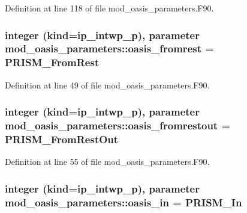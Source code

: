 Definition at line 118 of file mod\+\_\+oasis\+\_\+parameters.\+F90.

\hypertarget{classmod__oasis__parameters_aa0584909970d34364b7ec319292b1682}{
\subsubsection[{oasis\+\_\+fromrest}]{\setlength{\rightskip}{0pt plus 5cm}integer (kind=ip\+\_\+intwp\+\_\+p), parameter mod\+\_\+oasis\+\_\+parameters\+::oasis\+\_\+fromrest = P\+R\+I\+S\+M\+\_\+\+From\+Rest}}\label{classmod__oasis__parameters_aa0584909970d34364b7ec319292b1682}


Definition at line 49 of file mod\+\_\+oasis\+\_\+parameters.\+F90.

\hypertarget{classmod__oasis__parameters_a76a87a170e0c08863ae981693eb88fb8}{
\subsubsection[{oasis\+\_\+fromrestout}]{\setlength{\rightskip}{0pt plus 5cm}integer (kind=ip\+\_\+intwp\+\_\+p), parameter mod\+\_\+oasis\+\_\+parameters\+::oasis\+\_\+fromrestout = P\+R\+I\+S\+M\+\_\+\+From\+Rest\+Out}}\label{classmod__oasis__parameters_a76a87a170e0c08863ae981693eb88fb8}


Definition at line 55 of file mod\+\_\+oasis\+\_\+parameters.\+F90.

\hypertarget{classmod__oasis__parameters_a16809ad581bb609aa5b0661927478653}{
\subsubsection[{oasis\+\_\+in}]{\setlength{\rightskip}{0pt plus 5cm}integer (kind=ip\+\_\+intwp\+\_\+p), parameter mod\+\_\+oasis\+\_\+parameters\+::oasis\+\_\+in = P\+R\+I\+S\+M\+\_\+\+In}}\label{classmod__oasis__parameters_a16809ad581bb609aa5b0661927478653}


